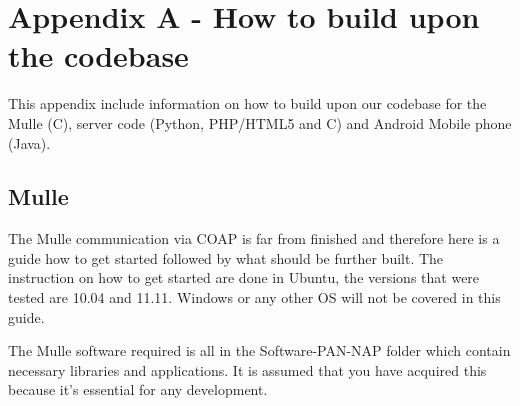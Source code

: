 

\section{Appendix A - How to build upon the codebase}
This appendix include information on how to build upon our codebase for the Mulle (C), server code (Python, PHP/HTML5 and C) and Android Mobile phone (Java).
\subsection{Mulle}
The Mulle communication via COAP is far from finished and therefore here is a guide how to get started followed by what should be further built. The instruction on how to get started are done in Ubuntu, the versions that were tested are 10.04 and 11.11. Windows or any other OS will not be covered in this guide.

The Mulle software required is all in the Software-PAN-NAP folder which contain necessary libraries and applications. It is assumed that you have acquired this because it's essential for any development.

